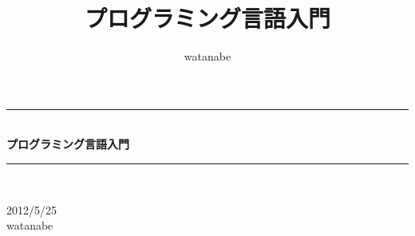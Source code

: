 \documentclass[mingoth,oneside]{jsbook}
\title{ {\Huge プログラミング言語入門}}
\author{watanabe}
\newcommand{\HRule}{\rule{\linewidth}{0.5mm}}
\begin{document}
\begin{titlepage}
\begin{center}

\vspace*{5cm}
\HRule \\[0.4cm]
{ \huge \bfseries プログラミング言語入門}\\[0.4cm]

\HRule \\[1.5cm]

\vspace*{8cm}

\begin{minipage}{0.4\textwidth}
\begin{flushright} \large
{\large 2012/5/25} \\

watanabe
\end{flushright}
\end{minipage}


\vspace*{3cm}

\end{center}
\end{titlepage}




\tableofcontents








\end{document}
